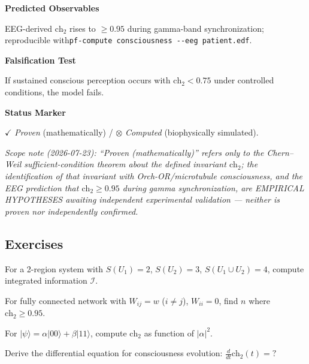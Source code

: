 \textbf{Predicted Observables}

EEG-derived $\text{ch}_2$ rises to $\geq 0.95$ during gamma-band synchronization; reproducible with\linebreak[1]
\texttt{pf-compute consciousness -{}-eeg patient.edf}.

\textbf{Falsification Test}

If sustained conscious perception occurs with $\text{ch}_2 < 0.75$ under controlled conditions, the model fails.

\textbf{Status Marker}

$\checkmark$ \textit{Proven} (mathematically) / $\otimes$ \textit{Computed} (biophysically simulated).

\noindent\emph{Scope note (2026-07-23): ``Proven (mathematically)'' refers only to the Chern--Weil \emph{sufficient}-condition theorem about the \emph{defined} invariant $\text{ch}_2$; the identification of that invariant with Orch-OR/microtubule consciousness, and the EEG prediction that $\text{ch}_2 \geq 0.95$ during gamma synchronization, are EMPIRICAL HYPOTHESES awaiting independent experimental validation --- neither is proven nor independently confirmed.}

\subsection{Exercises}

\begin{exercise}
For a 2-region system with $S(U_1) = 2$, $S(U_2) = 3$, $S(U_1 \cup U_2) = 4$, compute integrated information $\mathcal{I}$.
\end{exercise}

\begin{exercise}
For fully connected network with $W_{ij} = w$ ($i \neq j$), $W_{ii} = 0$, find $n$ where $\text{ch}_2 \geq 0.95$.
\end{exercise}

\begin{exercise}
For $|\psi\rangle = \alpha|00\rangle + \beta|11\rangle$, compute $\text{ch}_2$ as function of $|\alpha|^2$.
\end{exercise}

\begin{level3}
Derive the differential equation for consciousness evolution: $\frac{d}{dt}\text{ch}_2(t) = ?$
\end{level3}

